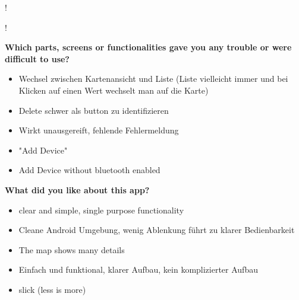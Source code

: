 \begin{flushleft}
\resizebox {\textwidth/2} {!} {
}\resizebox {\textwidth/2} {!} {
}



\textbf{Which parts, screens or functionalities gave you any trouble or were difficult to use?}
\begin{itemize}
	\item Wechsel zwischen Kartenansicht und Liste (Liste vielleicht immer und bei Klicken auf einen Wert wechselt man auf die Karte)
	\item Delete schwer als button zu identifizieren
	\item Wirkt unausgereift, fehlende Fehlermeldung
	\item "Add Device"
	\item Add Device without bluetooth enabled
\end{itemize}
\par

\textbf{What did you like about this app?}
\begin{itemize}
	\item clear and simple, single purpose functionality
	\item Cleane Android Umgebung, wenig Ablenkung führt zu klarer Bedienbarkeit
	\item The map shows many details
	\item Einfach und funktional, klarer Aufbau, kein komplizierter Aufbau
	\item slick (less is more)
\end{itemize}


\end{flushleft}
